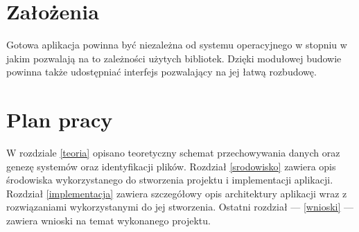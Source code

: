 \section{Założenia}
Gotowa aplikacja powinna być niezależna od systemu operacyjnego w stopniu w jakim pozwalają na to zależności użytych bibliotek. Dzięki modułowej budowie powinna także udostępniać interfejs pozwalający na jej łatwą rozbudowę.

\section{Plan pracy}
W rozdziale \ref{teoria} opisano teoretyczny schemat przechowywania danych oraz genezę systemów oraz identyfikacji plików. Rozdział \ref{srodowisko} zawiera opis środowiska wykorzystanego do stworzenia projektu i implementacji aplikacji.
Rozdział \ref{implementacja} zawiera szczegółowy opis architektury aplikacji wraz z rozwiązaniami wykorzystanymi do jej stworzenia.
Ostatni rozdział --- \ref{wnioski} --- zawiera wnioski na temat wykonanego projektu.

\clearpage
